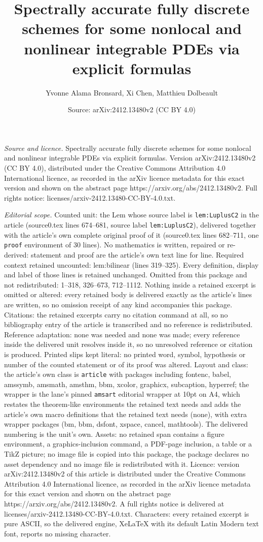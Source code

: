 \documentclass[10pt,a4paper]{amsart}
\title[Spectrally accurate fully discrete schemes for some nonlocal]{Spectrally accurate fully discrete schemes for some nonlocal and nonlinear integrable PDEs via explicit formulas}
\author{Yvonne Alama Bronsard, Xi Chen, Matthieu Dolbeault}
\date{Source: arXiv:2412.13480v2 (CC BY 4.0)}
\begin{document}
\maketitle

\noindent\emph{Source and licence.} Spectrally accurate fully discrete schemes for some nonlocal and nonlinear integrable PDEs via explicit formulas. Version arXiv:2412.13480v2 (CC BY 4.0), distributed under the Creative Commons Attribution 4.0 International licence, as recorded in the arXiv licence metadata for this exact version and shown on the abstract page https://arxiv.org/abs/2412.13480v2. Full rights notice: licenses/arxiv-2412.13480-CC-BY-4.0.txt.\par\smallskip

\noindent\textit{Editorial scope.} Counted unit: the Lem whose source label is \texttt{lem:LuplusC2} in the article (source0.tex lines 674--681, source label \texttt{lem:LuplusC2}), delivered together with the article's own complete original proof of it (source0.tex lines 682--711, one \texttt{proof} environment of 30 lines). No mathematics is written, repaired or re-derived: statement and proof are the article's own text line for line. Required context retained uncounted: lem:bilinear (lines 319--325). Every definition, display and label of those lines is retained unchanged. Omitted from this package and not redistributed: 1--318, 326--673, 712--1112. Nothing inside a retained excerpt is omitted or altered: every retained body is delivered exactly as the article's lines are written, so no omission receipt of any kind accompanies this package. Citations: the retained excerpts carry no citation command at all, so no bibliography entry of the article is transcribed and no reference is redistributed. Reference adaptation: none was needed and none was made; every reference inside the delivered unit resolves inside it, so no unresolved reference or citation is produced. Printed slips kept literal: no printed word, symbol, hypothesis or number of the counted statement or of its proof was altered. Layout and class: the article's own class is \texttt{article} with packages including fontenc, babel, amssymb, amsmath, amsthm, bbm, xcolor, graphicx, subcaption, hyperref; the wrapper is the lane's pinned \texttt{amsart} editorial wrapper at 10pt on A4, which restates the theorem-like environments the retained text needs and adds the article's own macro definitions that the retained text needs (none), with extra wrapper packages (bm, bbm, dsfont, xspace, cancel, mathtools). The delivered numbering is the unit's own. Assets: no retained span contains a figure environment, a graphics-inclusion command, a PDF-page inclusion, a table or a TikZ picture; no image file is copied into this package, the package declares no asset dependency and no image file is redistributed with it. Licence: version arXiv:2412.13480v2 of this article is distributed under the Creative Commons Attribution 4.0 International licence, as recorded in the arXiv licence metadata for this exact version and shown on the abstract page https://arxiv.org/abs/2412.13480v2. A full rights notice is delivered at licenses/arxiv-2412.13480-CC-BY-4.0.txt. Characters: every retained excerpt is pure ASCII, so the delivered engine, XeLaTeX with its default Latin Modern text font, reports no missing character.
\end{document}
